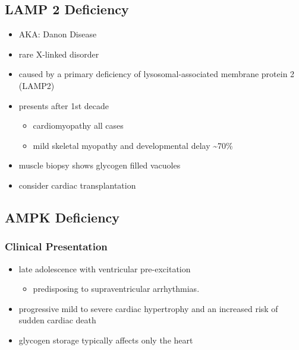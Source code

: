 \documentclass{scrartcl}
\begin{document}
\subsection{LAMP 2 Deficiency}
\label{sec:orge2098a7}
\begin{itemize}
\item AKA: Danon Disease
\item rare X-linked disorder
\item caused by a primary deficiency of lysosomal-associated membrane
protein 2 (LAMP2)
\item presents after 1st decade
\begin{itemize}
\item cardiomyopathy all cases
\item mild skeletal myopathy and developmental delay \textasciitilde{}70\%
\end{itemize}
\item muscle biopsy shows glycogen filled vacuoles
\item consider cardiac transplantation
\end{itemize}

\subsection{AMPK Deficiency}
\label{sec:org522fa07}
\subsubsection{Clinical Presentation}
\label{sec:orgdd32284}
\begin{itemize}
\item late adolescence with ventricular pre-excitation
\begin{itemize}
\item predisposing to supraventricular arrhythmias.
\end{itemize}
\item progressive mild to severe cardiac hypertrophy and an increased risk
of sudden cardiac death
\item glycogen storage typically affects only the heart
\end{itemize}
\end{document}
